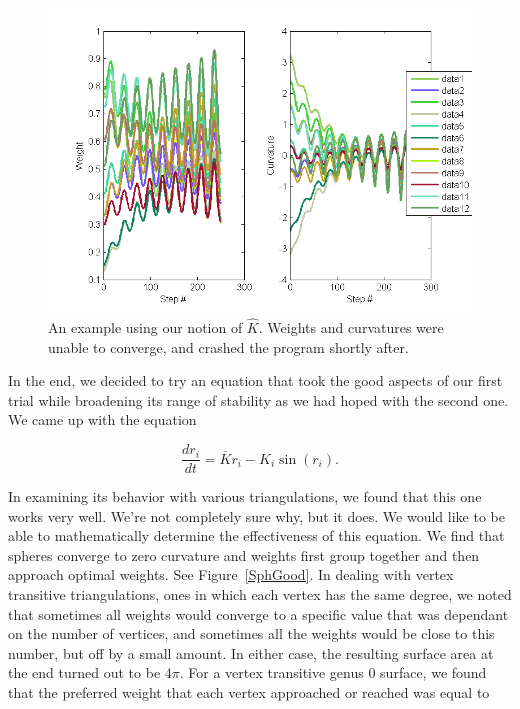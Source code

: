 \documentclass[12pt]{article}
\begin{document}
\begin{itemize}
\begin{figure}
\centering
\includegraphics[scale = 0.65]{Pictures/kHatResult.png}
\caption{An example using our notion of $\hat{K}$. Weights and curvatures were unable to converge, and crashed the program shortly after.}
\label{kHat}
\end{figure}

\end{itemize}

\noindent In the end, we decided to try an equation that took the good aspects of our first trial while broadening its range of stability as we had hoped with the second one. We came up with the equation

\begin{equation}
\label{SRicciN}
\frac{dr_i}{dt} = \overline{K}r_i - K_i\sin(r_i).
\end{equation}

\noindent In examining its behavior with various triangulations, we found that this one works very well. We're not completely sure why, but it does. We would like to be able to mathematically determine the effectiveness of this equation. We find that spheres converge to zero curvature and weights first group together and then approach optimal weights. See Figure~\ref{SphGood}. In dealing with vertex transitive triangulations, ones in which each vertex has the same degree, we noted that sometimes all weights would converge to a specific value that was dependant on the number of vertices, and sometimes all the weights would be close to this number, but off by a small amount. In either case, the resulting surface area at the end turned out to be $4\pi$. For a vertex transitive genus 0 surface, we found that the preferred weight that each vertex approached or reached was equal to 
\end{document}
